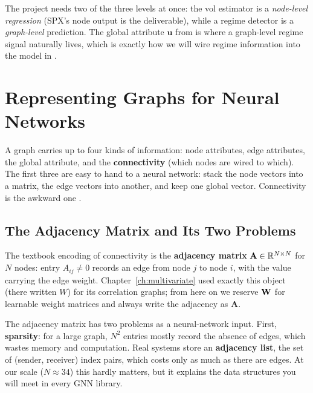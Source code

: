 \begin{projectconnection}
The project needs two of the three levels at once: the vol estimator is a \emph{node-level regression} (SPX's node output is the deliverable), while a regime detector is a \emph{graph-level} prediction. The global attribute $\mathbf{u}$ from  is where a graph-level regime signal naturally lives, which is exactly how we will wire regime information into the model in .
\end{projectconnection}

\section{Representing Graphs for Neural Networks}\label{sec:gnn:representation}

A graph carries up to four kinds of information: node attributes, edge attributes, the global attribute, and the \textbf{connectivity} (which nodes are wired to which). The first three are easy to hand to a neural network: stack the node vectors into a matrix, the edge vectors into another, and keep one global vector. Connectivity is the awkward one \citep{SanchezLengeling2021}.

\subsection{The Adjacency Matrix and Its Two Problems}

The textbook encoding of connectivity is the \textbf{adjacency matrix} $\mathbf{A} \in \mathbb{R}^{N \times N}$ for $N$ nodes: entry $A_{ij} \neq 0$ records an edge from node $j$ to node $i$, with the value carrying the edge weight. Chapter~\ref{ch:multivariate} used exactly this object (there written $W$) for its correlation graphs; from here on we reserve $\mathbf{W}$ for learnable weight matrices and always write the adjacency as $\mathbf{A}$.

The adjacency matrix has two problems as a neural-network input. First, \textbf{sparsity}: for a large graph, $N^2$ entries mostly record the absence of edges, which wastes memory and computation. Real systems store an \textbf{adjacency list}, the set of (sender, receiver) index pairs, which costs only as much as there are edges. At our scale ($N \approx 34$) this hardly matters, but it explains the data structures you will meet in every GNN library.

